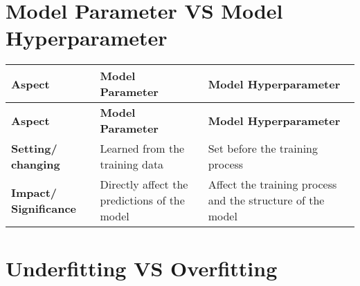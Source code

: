 
\section{Model Parameter VS Model Hyperparameter \cite{chatgpt}}\label{Model Parameter VS Model Hyperparameter}

\begin{longtable}{|p{3cm}|p{6cm}|p{6cm}|}
    \hline
    \textbf{Aspect} & \textbf{Model Parameter} & \textbf{Model Hyperparameter} \\
    \hline
    \endfirsthead

    \hline
    \textbf{Aspect} & \textbf{Model Parameter} & \textbf{Model Hyperparameter} \\
    \hline
    \endhead

    \hline\endfoot
    \hline\endlastfoot

    \textbf{Setting/ changing} & Learned from the training data & Set before the training process \\ 
    \hline

    \textbf{Impact/ Significance} & Directly affect the predictions of the model & Affect the training process and the structure of the model \\
    \hline
\end{longtable}


\section{Underfitting VS Overfitting \cite{chatgpt}}\label{Underfitting VS Overfitting}


